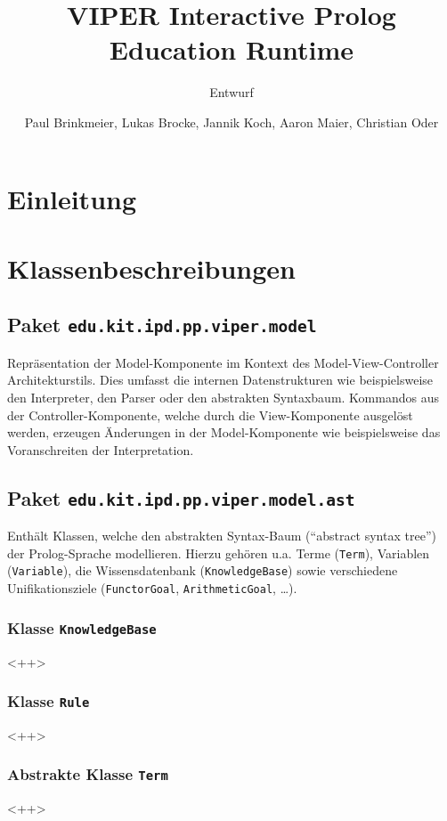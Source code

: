 \documentclass[parskip=full,11pt,twoside]{scrartcl}
\title{VIPER Interactive Prolog Education Runtime}
\subtitle{Entwurf}
\author{Paul Brinkmeier, Lukas Brocke, Jannik Koch, Aaron Maier, Christian Oder}
\begin{document}
\maketitle

\section{Einleitung}

\section{Klassenbeschreibungen}

\subsection{Paket \texttt{edu.kit.ipd.pp.viper.model}}

Repräsentation der Model-Komponente im Kontext des Model-View-Controller Architekturstils. Dies umfasst die internen Datenstrukturen wie beispielsweise den Interpreter, den Parser oder den abstrakten Syntaxbaum. Kommandos aus der Controller-Komponente, welche durch die View-Komponente ausgelöst werden, erzeugen Änderungen in der Model-Komponente wie beispielsweise das Voranschreiten der Interpretation.

\subsection{Paket \texttt{edu.kit.ipd.pp.viper.model.ast}}

Enthält Klassen, welche den abstrakten Syntax-Baum (\enquote{abstract syntax tree}) der Prolog-Sprache modellieren. Hierzu gehören u.a. Terme (\texttt{Term}), Variablen (\texttt{Variable}), die Wissensdatenbank (\texttt{KnowledgeBase}) sowie verschiedene Unifikationsziele (\texttt{FunctorGoal}, \texttt{ArithmeticGoal}, \dots).

\subsubsection{Klasse \texttt{KnowledgeBase}}
<++>

\subsubsection{Klasse \texttt{Rule}}
<++>
\subsubsection{Abstrakte Klasse \texttt{Term}}
<++>
\end{document}
